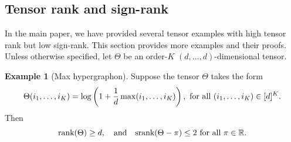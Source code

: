 \documentclass[11pt]{article}
\theoremstyle{plain}
\theoremstyle{definition}
\newtheorem{example}{Example}[section]
\def\srank{\textup{srank}}
\def\rank{\textup{rank}}
\begin{document}
\subsection{Tensor rank and sign-rank}\label{sec:high-rank}
In the main paper, we have provided several tensor examples with high tensor rank but low sign-rank. This section provides more examples and their proofs. 
Unless otherwise specified, let $\Theta$ be an order-$K$ $(d,\ldots,d)$-dimensional tensor. 
\begin{example}[Max hypergraphon]\label{example:max} Suppose the tensor $\Theta$ takes the form 
\[
\Theta(i_1,\ldots,i_K)=\log\left(1+{1\over d}\max(i_1,\ldots,i_K)\right), \ \text{for all }(i_1,\ldots,i_K)\in[d]^K.
\]
 Then 
 \[
 \rank(\Theta)\geq d, \quad \text{and}\quad \srank(\Theta-\pi)\leq 2\ \text{for all }\pi\in\mathbb{R}. 
 \]
\end{example}
\end{document}
